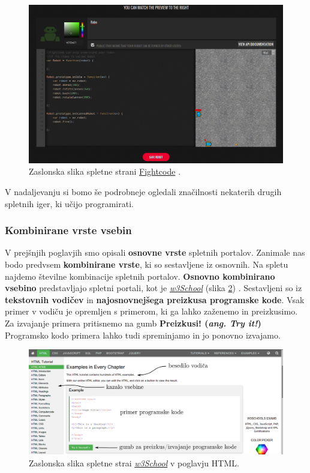 \begin{figure}[h!]
    \includegraphics [width=1\linewidth, keepaspectratio =
    1] {./images/sc_web/fightRobot_01.jpg}
    \caption{Zaslonska slika spletne strani
      {\href{http://fightcodegame.com/}{Fightcode}}
      \cite{web:fightcode}.}
    \label{fig:fightcode}
\end{figure}

V nadaljevanju si bomo še podrobneje ogledali značilnosti nekaterih drugih
spletnih iger, ki učijo programirati.

\subsubsection{Kombinirane vrste vsebin}
\label{sec:kombinirane_vrste_vsebin}

V prejšnjih poglavjih smo opisali \textbf{osnovne vrste} spletnih
portalov. Zanimale nas bodo predvsem \textbf{kombinirane vrste}, ki so
sestavljene iz osnovnih. Na spletu najdemo številne kombinacije
spletnih portalov. \textbf{Osnovno kombinirano vsebino} predstavljajo
spletni portali, kot je
\emph{\href{http://www.w3schools.com/}{w3School}} (slika
\ref{fig:scr:web:w3school}) \cite{web:w3school}. Sestavljeni so iz
\textbf{tekstovnih vodičev} in \textbf{najosnovnejšega preizkusa
  programske kode}. Vsak primer v vodiču je opremljen s primerom,
ki ga lahko zaženemo in preizkusimo. Za izvajanje primera
pritisnemo na gumb \textbf{Preizkusi!  (\emph{ang. Try it!})}
Programsko kodo primera lahko tudi spreminjamo in jo ponovno izvajamo.

\begin{figure}[h!]
    \includegraphics [width=1\linewidth, keepaspectratio =
    1] {./images/sc_web/w3school.jpg}
    \caption{Zaslonska slika spletne strai
      \emph{\href{http://www.w3schools.com/}{w3School}}
      \cite{web:w3school} v poglavju HTML.}
    \label{fig:scr:web:w3school}
\end{figure}

